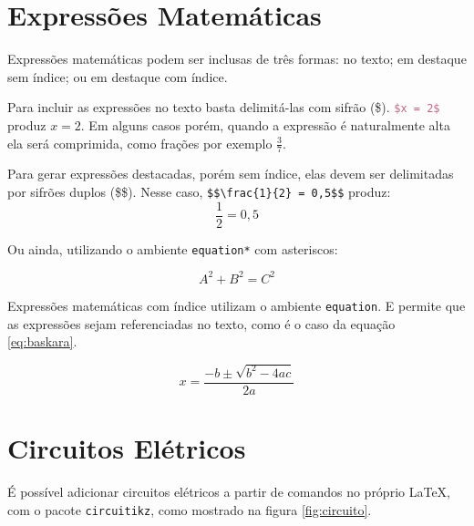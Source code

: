 
\section{Expressões Matemáticas}
\label{sec:exmatematicas}

    Expressões matemáticas podem ser inclusas de três formas:
    no texto; em destaque sem índice; ou em destaque com índice.


    Para incluir as expressões no texto basta delimitá-las com sifrão (\$).
    \lstinline[language=TeX,style=code]|$x = 2$| produz $x = 2$.
    Em alguns casos porém, quando a expressão é naturalmente alta ela será comprimida, como frações por exemplo $\frac{3}{7}$.


    Para gerar expressões destacadas, porém sem índice, elas devem ser delimitadas por sifrões duplos (\$\$).
    Nesse caso, \lstinline[language=teX,style=code]|$$\frac{1}{2} = 0,5$$| produz:
    $$\frac{1}{2} = 0,5$$

    Ou ainda, utilizando o ambiente \lstinline[language=TeX,style=code]|equation*| com asteriscos:
    
    \begin{equation*}
        A^{2} + B^{2} = C^{2}
    \end{equation*}


    Expressões matemáticas com índice utilizam o ambiente \lstinline[language=TeX,style=code]|equation|.
    E permite que as expressões sejam referenciadas no texto, como é o caso da equação \ref{eq:baskara}.

    \begin{equation}
        x = \frac{-b \pm \sqrt{b^2 - 4ac}}{2a}
        \label{eq:baskara}
    \end{equation}



\section{Circuitos Elétricos}
\label{sec:circuitos}

    É possível adicionar circuitos elétricos a partir de comandos no próprio \LaTeX, com o pacote \texttt{circuitikz}, como mostrado na figura \ref{fig:circuito}.

